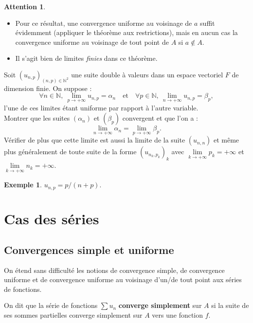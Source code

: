 \documentclass[french]{article}
\newcommand{\N}{\mathbb{N}}
\theoremstyle{plain}
\theoremstyle{definition}
\newtheorem*{ex}{Exemple}
\newtheorem*{attention}{Attention}
\theoremstyle{remark}
\begin{document}
\begin{attention}
	\begin{itemize}
		\item Pour ce résultat, une convergence uniforme au voisinage de $a$ suffit évidemment (appliquer le théorème aux restrictions), mais en aucun cas la convergence uniforme au voisinage de tout point de $A$ si $a\notin A$.
		\item Il s'agit bien de limites \textit{finies} dans ce théorème.
	\end{itemize}
\end{attention}

\begin{exo}
	Soit $(u_{n,p})_{(n,p)\in\N^2}$ une suite double à valeurs dans un espace vectoriel $F$ de dimension finie. On suppose :
	$$\forall n\in\N,\ \underset{p\to+\infty}{\lim}u_{n,p}=\alpha_n\quad\text{et}\quad\forall p\in\N,\ \underset{n\to+\infty}{\lim}u_{n,p}=\beta_p,$$ l'une de ces limites étant uniforme par rapport à l'autre variable. \\
	Montrer que les suites $(\alpha_n)$ et $(\beta_p)$ convergent et que l'on a :
	$$\underset{n\to+\infty}{\lim}\alpha_n=\underset{p\to+\infty}{\lim}\beta_p.$$
	Vérifier de plus que cette limite est aussi la limite de la suite $(u_{n,n})$ et même plus généralement de toute suite de la forme $(u_{n_k,p_k})_k$ avec $\underset{k\to+\infty}{\lim}p_k=+\infty$ et $\underset{k\to+\infty}{\lim}n_k=+\infty$.
\end{exo}

\begin{ex}
	$u_{n,p}=p/(n+p)$.
\end{ex}

\section{Cas des séries}

\subsection{Convergences simple et uniforme}

On étend sans difficulté les notions de convergence simple, de convergence uniforme et de convergence uniforme au voisinage d'un/de tout point aux séries de fonctions.

\begin{dfn}
	On dit que la série de fonctions $\displaystyle\sum u_n$ \textbf{converge simplement} sur $A$ si la suite de ses sommes partielles converge simplement sur $A$ vers une fonction $f$.
\end{dfn}
\end{document}
